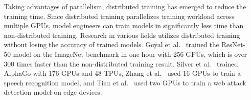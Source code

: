 Taking advantages of parallelism, distributed training has emerged to reduce
the training time. 
Since distributed training parallelizes training workload across multiple GPUs,
model engineers can train models in significantly less time than
non-distributed training.
Research in various fields utilizes distributed training without losing
the accuracy of trained models.
Goyal et al.~\cite{goyal2017accurate} trained the ResNet-50 model on the ImageNet
benchmark in one hour with 256 GPUs, which is over 300 times faster than the
non-distributed training result.
Silver et al.~\cite{Silver2017alphagozero} trained AlphaGo with 176
GPUs and 48 TPUs, Zhang et al.~\cite{zhang2019distributed} used 16 GPUs to train
a speech recognition model, and Tian et al.~\cite{tian2019distributed} used
two GPUs to train a web attack detection model on edge devices.



